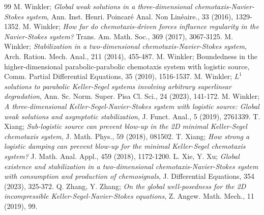 \documentclass[10pt,a4paper]{amsart}
\numberwithin{equation}{section}
\begin{document}
\begin{thebibliography}{99}
 M. Winkler;
\emph{Global weak solutions in a three-dimensional chemotaxis-Navier-Stokes system}, 
Ann. Inst. Henri. Poincar\'e Anal. Non Lin\'eaire., 33 (2016), 1329-1352.
 M. Winkler;
\emph{How far do chemotaxis-driven forces influence regularity in the Navier-Stokes 
system?} Trans. Am. Math. Soc., 369 (2017), 3067-3125.
 M. Winkler;
\emph{Stabilization in a two-dimensional chemotaxis-Navier-Stokes system}, 
Arch. Ration. Mech. Anal., 211 (2014), 455-487.
 M. Winkler; Boundedness in the higher-dimensional parabolic-parabolic chemotaxis system with logistic source, Comm. Partial Differential Equations, 35 (2010), 1516-1537.
 M. Winkler;
\emph{$L^1$ solutions to parabolic Keller-Segel systems involving arbitrary superlinear 
degradation}, Ann. Sc. Norm. Super. Pisa Cl. Sci., 24 (2023), 141-172.
 M. Winkler;
\emph{A three-dimensional Keller-Segel-Navier-Stokes system with logistic source: 
Global weak solutions and asymptotic stabilization}, J. Funct. Anal., 5 (2019), 2761339.
 T. Xiang;
\emph{Sub-logistic source can prevent blow-up in the 2D minimal Keller-Segel 
chemotaxis system}, J. Math. Phys., 59 (2018), 081502.
 T. Xiang;
\emph{How strong a logistic damping can prevent blow-up for the minimal Keller-Segel 
chemotaxis system?} J. Math. Anal. Appl., 459 (2018), 1172-1200.
 L. Xie, Y. Xu;
\emph{Global existence and stabilization in a two-dimensional chemotaxis-Navier-Stokes 
system with consumption and production of chemosignals}, 
J. Differential Equations, 354 (2023), 325-372.
 Q. Zhang, Y. Zhang;
\emph{On the global well-posedness for the 2D incompressible Keller-Segel-Navier-Stokes 
equations}, Z. Angew. Math. Mech., 11 (2019), 99.
\end{thebibliography}
\end{document}
